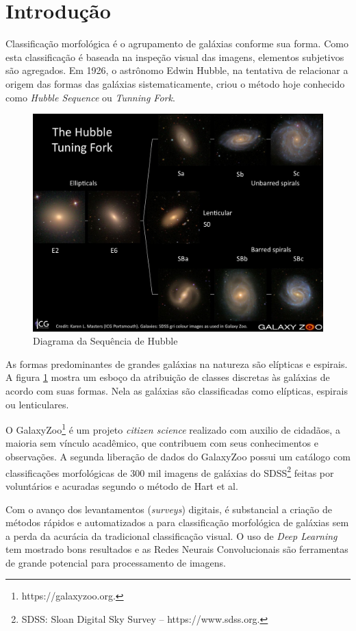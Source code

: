 \section*{Introdução}

Classificação morfológica é o agrupamento de galáxias conforme sua forma. Como esta classificação é baseada na inspeção visual das imagens, elementos subjetivos são agregados. Em 1926, o astrônomo Edwin Hubble, na tentativa de relacionar a origem das formas das galáxias sistematicamente, criou o método hoje conhecido como \emph{Hubble Sequence} ou \emph{Tunning Fork}. \cite{hubble1926, fortson2012}

\begin{figure}[h!]
    \centering
    \includegraphics[width=.8\textwidth]{figures/tuningfork1.jpg}
    \caption{Diagrama da Sequência de Hubble}
    \label{fig:tuningfork}
\end{figure}

As formas predominantes de grandes galáxias na natureza são elípticas e espirais. A figura \ref{fig:tuningfork} mostra um esboço da atribuição de classes discretas às galáxias de acordo com suas formas. Nela as galáxias são classificadas como elípticas, espirais ou lenticulares. \cite{fortson2012}

O GalaxyZoo\footnote{https://galaxyzoo.org.} é um projeto \emph{citizen science} realizado com auxilio de cidadãos, a maioria sem vínculo acadêmico, que contribuem com seus conhecimentos e observações. A segunda liberação de dados do GalaxyZoo possui um catálogo com classificações morfológicas de 300 mil imagens de galáxias do SDSS\footnote{SDSS: Sloan Digital Sky Survey -- https://www.sdss.org.} feitas por voluntários e acuradas segundo o método de Hart et al. \cite{hart2016}

Com o avanço dos levantamentos (\emph{surveys}) digitais, é substancial a criação de métodos rápidos e automatizados a para classificação morfológica de galáxias sem a perda da acurácia da tradicional classificação visual. \cite{yamauchi2005} O uso de \emph{Deep Learning} tem mostrado bons resultados e as Redes Neurais Convolucionais são ferramentas de grande potencial para processamento de imagens. \cite{barchi2020, dai2018}

